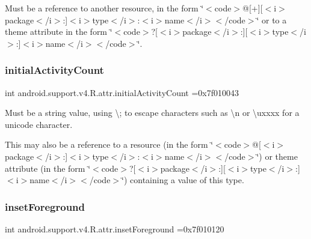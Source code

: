 Must be a reference to another resource, in the form \char`\"{}$<$code$>$@\mbox{[}+\mbox{]}\mbox{[}$<$i$>$package$<$/i$>$\+:\mbox{]}$<$i$>$type$<$/i$>$\+:$<$i$>$name$<$/i$>$$<$/code$>$\char`\"{} or to a theme attribute in the form \char`\"{}$<$code$>$?\mbox{[}$<$i$>$package$<$/i$>$\+:\mbox{]}\mbox{[}$<$i$>$type$<$/i$>$\+:\mbox{]}$<$i$>$name$<$/i$>$$<$/code$>$\char`\"{}. \mbox{\label{classandroid_1_1support_1_1v4_1_1R_1_1attr_a6e769e9a19c417859130f49992f57799}} 
\subsubsection{\texorpdfstring{initial\+Activity\+Count}{initialActivityCount}}
{\footnotesize\ttfamily int android.\+support.\+v4.\+R.\+attr.\+initial\+Activity\+Count =0x7f010043\hspace{0.3cm}{\ttfamily [static]}}

Must be a string value, using \textquotesingle{}\textbackslash{};\textquotesingle{} to escape characters such as \textquotesingle{}\textbackslash{}n\textquotesingle{} or \textquotesingle{}\textbackslash{}uxxxx\textquotesingle{} for a unicode character. 

This may also be a reference to a resource (in the form \char`\"{}$<$code$>$@\mbox{[}$<$i$>$package$<$/i$>$\+:\mbox{]}$<$i$>$type$<$/i$>$\+:$<$i$>$name$<$/i$>$$<$/code$>$\char`\"{}) or theme attribute (in the form \char`\"{}$<$code$>$?\mbox{[}$<$i$>$package$<$/i$>$\+:\mbox{]}\mbox{[}$<$i$>$type$<$/i$>$\+:\mbox{]}$<$i$>$name$<$/i$>$$<$/code$>$\char`\"{}) containing a value of this type. \mbox{\label{classandroid_1_1support_1_1v4_1_1R_1_1attr_acc9e3a4e14d94e134cd2db9c8793285e}} 
\subsubsection{\texorpdfstring{inset\+Foreground}{insetForeground}}
{\footnotesize\ttfamily int android.\+support.\+v4.\+R.\+attr.\+inset\+Foreground =0x7f010120\hspace{0.3cm}{\ttfamily [static]}}

